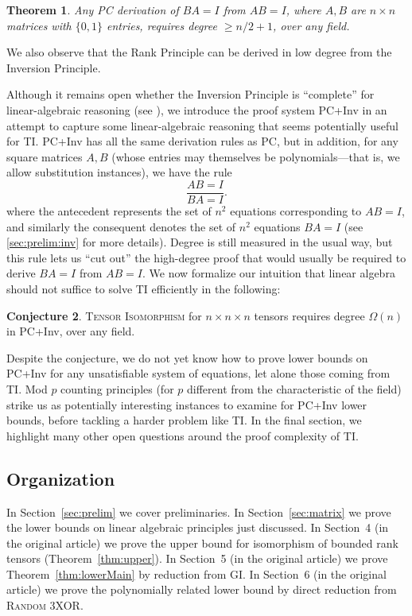 \documentclass[10pt,a4paper]{article}
\newtheorem{theorem}{Theorem}[section]
\theoremstyle{definition}
\newtheorem{conjecture}[theorem]{Conjecture}
\begin{document}
\begin{theorem}
Any PC derivation of $BA = I$ from $AB=I$, where $A,B$ are $n \times n$ matrices with $\{0,1\}$ entries, requires degree $\geq n/2+1$, over any field.
\end{theorem}


We also observe that the Rank Principle can be derived in low degree from the Inversion Principle. 

Although it remains open whether the Inversion Principle is ``complete'' for linear-algebraic reasoning (see \cite{soltys, SC}), we introduce the proof system PC+Inv in an attempt to capture some linear-algebraic reasoning that seems potentially useful for \textsc{TI}. PC+Inv has all the same derivation rules as PC, but in addition, for any square matrices $A,B$ (whose entries may themselves be polynomials---that is, we allow substitution instances), we have the rule
\[
\frac{AB=I}{BA=I}.
\]
where the antecedent represents the set of $n^2$ equations corresponding to $AB=I$, and similarly the consequent denotes the set of $n^2$ equations $BA=I$ (see \ref{sec:prelim:inv} for more details). Degree is still measured in the usual way, but this rule lets us ``cut out'' the high-degree proof that would usually be required to derive $BA=I$ from $AB=I$. We now formalize our intuition that linear algebra should not suffice to solve \textsc{TI} efficiently in the following:

\begin{conjecture} \label{conj:inv}
\textsc{Tensor Isomorphism} for $n \times n \times n$ tensors requires degree $\Omega(n)$ in PC+Inv, over any field.
\end{conjecture}

Despite the conjecture, we do not yet know how to prove lower bounds on PC+Inv for any unsatisfiable system of equations, let alone those coming from \textsc{TI}. Mod $p$ counting principles (for $p$ different from the characteristic of the field) strike us as potentially interesting instances to examine for PC+Inv lower bounds, before tackling a harder problem like \textsc{TI}. In the final section, we highlight many other open questions around the proof complexity of \textsc{TI}.

\subsection{Organization}
In Section~\ref{sec:prelim} we cover preliminaries. In Section~\ref{sec:matrix} we prove the lower bounds on linear algebraic principles just discussed. In Section~4 (in the original article) we prove the upper bound for isomorphism of bounded rank tensors (Theorem~\ref{thm:upper}). In Section~5 (in the original article) we prove Theorem~\ref{thm:lowerMain} by reduction from \textsc{GI}. In Section~6 (in the original article) we prove the polynomially related lower bound by direct reduction from \textsc{Random 3XOR}.
\end{document}
